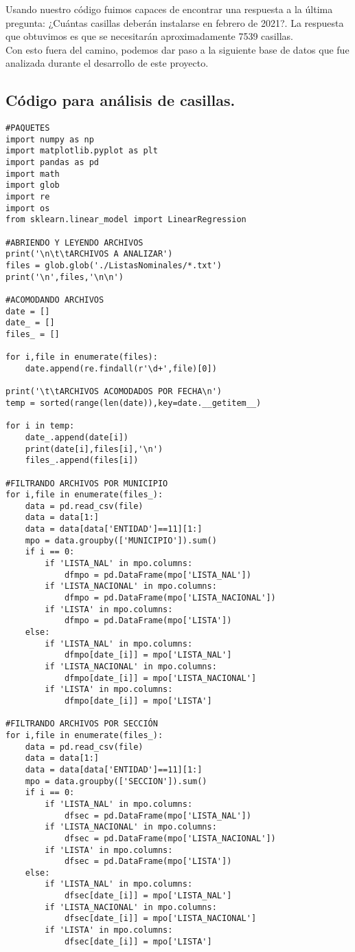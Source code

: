 \documentclass[12pt]{article}
\begin{document}
Usando nuestro código fuimos capaces de encontrar una respuesta a la última pregunta: ¿Cuántas casillas deberán instalarse en febrero de 2021?. La respuesta que obtuvimos es que se necesitarán aproximadamente 7539 casillas.\\

Con esto fuera del camino, podemos dar paso a la siguiente base de datos que fue analizada durante el desarrollo de este proyecto.  

\subsection{Código para análisis de casillas.}

\begin{verbatim}
#PAQUETES
import numpy as np
import matplotlib.pyplot as plt
import pandas as pd
import math 
import glob
import re
import os
from sklearn.linear_model import LinearRegression 

#ABRIENDO Y LEYENDO ARCHIVOS
print('\n\t\tARCHIVOS A ANALIZAR')
files = glob.glob('./ListasNominales/*.txt')
print('\n',files,'\n\n')

#ACOMODANDO ARCHIVOS
date = []
date_ = []
files_ = []

for i,file in enumerate(files):
    date.append(re.findall(r'\d+',file)[0])

print('\t\tARCHIVOS ACOMODADOS POR FECHA\n')    
temp = sorted(range(len(date)),key=date.__getitem__)

for i in temp:
    date_.append(date[i])
    print(date[i],files[i],'\n')
    files_.append(files[i])

#FILTRANDO ARCHIVOS POR MUNICIPIO
for i,file in enumerate(files_):
    data = pd.read_csv(file)
    data = data[1:]
    data = data[data['ENTIDAD']==11][1:]
    mpo = data.groupby(['MUNICIPIO']).sum()
    if i == 0:
        if 'LISTA_NAL' in mpo.columns:
            dfmpo = pd.DataFrame(mpo['LISTA_NAL'])
        if 'LISTA_NACIONAL' in mpo.columns:
            dfmpo = pd.DataFrame(mpo['LISTA_NACIONAL'])
        if 'LISTA' in mpo.columns:
            dfmpo = pd.DataFrame(mpo['LISTA'])
    else:
        if 'LISTA_NAL' in mpo.columns:
            dfmpo[date_[i]] = mpo['LISTA_NAL']
        if 'LISTA_NACIONAL' in mpo.columns:
            dfmpo[date_[i]] = mpo['LISTA_NACIONAL']
        if 'LISTA' in mpo.columns:
            dfmpo[date_[i]] = mpo['LISTA']
            
#FILTRANDO ARCHIVOS POR SECCIÓN
for i,file in enumerate(files_):
    data = pd.read_csv(file)
    data = data[1:]
    data = data[data['ENTIDAD']==11][1:]
    mpo = data.groupby(['SECCION']).sum()
    if i == 0:
        if 'LISTA_NAL' in mpo.columns:
            dfsec = pd.DataFrame(mpo['LISTA_NAL'])
        if 'LISTA_NACIONAL' in mpo.columns:
            dfsec = pd.DataFrame(mpo['LISTA_NACIONAL'])
        if 'LISTA' in mpo.columns:
            dfsec = pd.DataFrame(mpo['LISTA'])
    else:
        if 'LISTA_NAL' in mpo.columns:
            dfsec[date_[i]] = mpo['LISTA_NAL']
        if 'LISTA_NACIONAL' in mpo.columns:
            dfsec[date_[i]] = mpo['LISTA_NACIONAL']
        if 'LISTA' in mpo.columns:
            dfsec[date_[i]] = mpo['LISTA']            


\end{verbatim}
\end{document}
